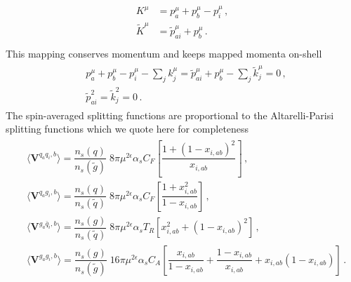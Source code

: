 \documentclass[main.tex]{subfiles}
\begin{document}
        \begin{align}\label{eqn:II_mapping2}
            \begin{split}
            K^{\mu} &= p_{a}^{\mu} + p_{b}^{\mu} - p_{i}^{\mu} \, ,\\
            \widetilde{K}^{\mu} &= \tilde{p}_{ai}^{\mu} + p_{b}^{\mu} \, . \\
            \end{split}
        \end{align}
        This mapping conserves momentum and keeps mapped momenta on-shell
        \begin{align}\label{eqn:II_mapping_conditions}
            \begin{split}
            &p_{a}^{\mu} + p_{b}^{\mu} - p_{i}^{\mu} - \sum_{j} k_{j}^{\mu} = \tilde{p}_{ai}^{\mu} + p_{b}^{\mu} - \sum_{j} \tilde{k}_{j}^{\mu} = 0\, , \\
            &\tilde{p}_{ai}^{2} = \tilde{k}_{j}^{2} = 0 \, .
            \end{split}
        \end{align}
        The spin-averaged splitting functions are proportional
        to the Altarelli-Parisi splitting functions which we
        quote here for completeness
        \begin{align}\label{V_aib}
            \begin{split}
            &\langle \boldsymbol{V}^{q_{a}q_{i},b} \rangle = \dfrac{n_{s}(q)}{n_{s}(\tilde{g})} \; 8\pi \mu^{2\epsilon} \alpha_{s} C_{F} \left[\dfrac{1 + (1-x_{i,ab})^{2}}{x_{i,ab}}\right] \, , \\
            &\langle \boldsymbol{V}^{q_{a}g_{i},b} \rangle = \dfrac{n_{s}(q)}{n_{s}(\tilde{q})} \; 8\pi \mu^{2\epsilon} \alpha_{s} C_{F} \left[\dfrac{1 + x_{i,ab}^{2}}{1 - x_{i,ab}}\right] \, , \\
            &\langle \boldsymbol{V}^{g_{a}\bar{q}_{i},b} \rangle = \dfrac{n_{s}(g)}{n_{s}(\tilde{q})} \; 8\pi \mu^{2\epsilon} \alpha_{s} T_{R} \left[x_{i,ab}^{2} + (1-x_{i,ab})^{2}\right] \, , \\
            &\langle \boldsymbol{V}^{g_{a}g_{i},b} \rangle = \dfrac{n_{s}(g)}{n_{s}(\tilde{g})} \; 16\pi \mu^{2\epsilon} \alpha_{s} C_{A} \left[\dfrac{x_{i,ab}}{1-x_{i,ab}} + \dfrac{1-x_{i,ab}}{x_{i,ab}} + x_{i,ab}(1-x_{i,ab})\right] \, .
            \end{split}
        \end{align}
\end{document}

